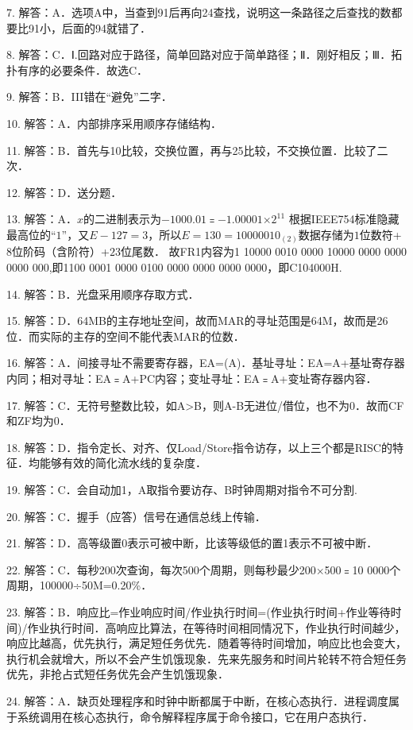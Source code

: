 7. 解答：A．选项A中，当查到91后再向24查找，说明这一条路径之后查找的数都要比91小，后面的94就错了．

8. 解答：C．Ⅰ.回路对应于路径，简单回路对应于简单路径；Ⅱ．刚好相反；Ⅲ．拓扑有序的必要条件．故选C．

9. 解答：B．III错在“避免”二字．

10. 解答：A．内部排序采用顺序存储结构．

11. 解答：B．首先与10比较，交换位置，再与25比较，不交换位置．比较了二次．

12. 解答：D．送分题．

13. 解答：A．$x$的二进制表示为$-1000.01$﹦$-1.000 01$×$2^{11}$ 根据IEEE754标准隐藏最高位的“$1$”，又$E-127=3$，所以$E=130=1000 0010_{(2)}$数据存储为$1$位数符+$8$位阶码（含阶符）+$23$位尾数．
故FR1内容为1 10000 0010 0000 10000 0000 0000 0000 000,即1100 0001 0000 0100 0000 0000 0000 0000，即C104000H.

14. 解答：B．光盘采用顺序存取方式．

15. 解答：D．64MB的主存地址空间，故而MAR的寻址范围是64M，故而是26位．而实际的主存的空间不能代表MAR的位数．

16. 解答：A．间接寻址不需要寄存器，EA=(A)．基址寻址：EA=A+基址寄存器内同；相对寻址：EA﹦A+PC内容；变址寻址：EA﹦A+变址寄存器内容．

17. 解答：C．无符号整数比较，如A>B，则A-B无进位/借位，也不为0．故而CF和ZF均为0．

18. 解答：D．指令定长、对齐、仅Load/Store指令访存，以上三个都是RISC的特征．均能够有效的简化流水线的复杂度．

19. 解答：C．会自动加1，A取指令要访存、B时钟周期对指令不可分割.

20. 解答：C．握手（应答）信号在通信总线上传输．

21. 解答：D．高等级置0表示可被中断，比该等级低的置1表示不可被中断．

22. 解答：C．每秒200次查询，每次500个周期，则每秒最少200×500﹦10 0000个周期，100000÷50M=0.20\%．

23. 解答：B．响应比=作业响应时间/作业执行时间=(作业执行时间+作业等待时间)/作业执行时间．高响应比算法，在等待时间相同情况下，作业执行时间越少，响应比越高，优先执行，满足短任务优先．随着等待时间增加，响应比也会变大，执行机会就增大，所以不会产生饥饿现象．先来先服务和时间片轮转不符合短任务优先，非抢占式短任务优先会产生饥饿现象．

24. 解答：A．缺页处理程序和时钟中断都属于中断，在核心态执行．进程调度属于系统调用在核心态执行，命令解释程序属于命令接口，它在用户态执行．

